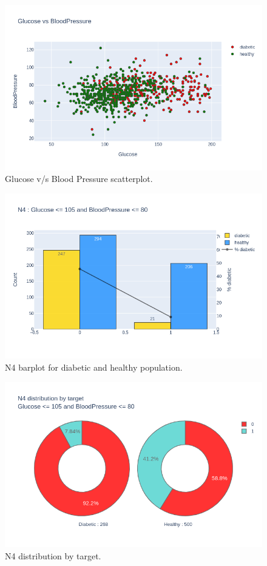 \documentclass[12pt]{article}
\begin{document}
\begin{figure}[ht]
\centering
\includegraphics[width=1\textwidth]{newplot(20).png}
\caption{\label{fig:30} Glucose v/s Blood Pressure scatterplot.}
\end{figure}

\begin{figure}[ht]
\centering
\includegraphics[width=1\textwidth]{newplot(21).png}
\caption{\label{fig:31} N4 barplot for diabetic and healthy population.}
\end{figure}

\begin{figure}[ht]
\centering
\includegraphics[width=1\textwidth]{newplot(22).png}
\caption{\label{fig:32} N4 distribution by target.}
\end{figure}
\end{document}
